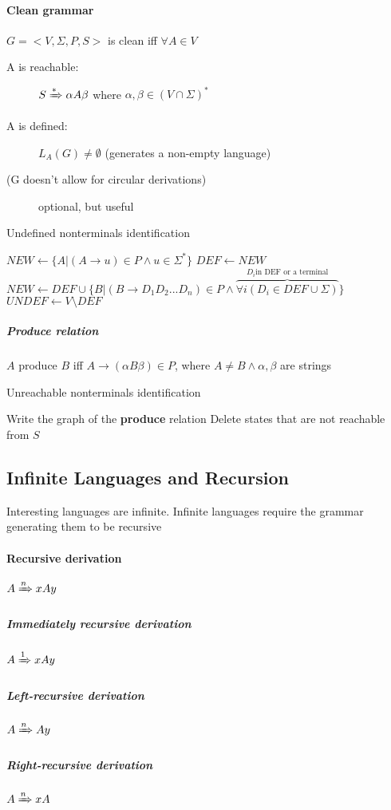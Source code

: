 \documentclass{article}
\newcommand{\derives}[1][ ]{\xRightarrow{#1}}
\begin{document}
\paragraph{Clean grammar} $G=<V,\Sigma, P, S>$ is clean iff $\forall A \in V$
\begin{description}
\item[A is reachable:] $S \derives[*] \alpha A \beta$ where $\alpha , \beta \in (V \cap \Sigma)^*$
\item[A is defined:] $L_A(G)\neq \emptyset$ (generates a non-empty language)
\item[(G doesn't allow for circular derivations)] optional, but useful
\end{description}
\begin{algorithm}[h!]
\caption{Undefined nonterminals identification}
\begin{algorithmic}
\STATE $NEW \leftarrow \{A|(A\rightarrow u) \in P \wedge u \in \Sigma^*\}$
\REPEAT
\STATE $DEF \leftarrow NEW$
\STATE $NEW \leftarrow DEF \cup \{B | (B \rightarrow D_1D_2...D_n)\in P \wedge \overbrace{\forall i(D_i\in DEF \cup \Sigma)}^{D_i \text{in DEF or a terminal}}\}$
\STATE $UNDEF \leftarrow V \setminus DEF$
\end{algorithmic}
\end{algorithm}
\subparagraph{Produce relation} $A$ produce $B$ iff $A \rightarrow (\alpha B \beta)\in P$, where $A \neq B \wedge \alpha, \beta$ are strings
\begin{algorithm}[h!]
\caption{Unreachable nonterminals identification}
\begin{algorithmic}
\STATE Write the graph of the \textbf{produce} relation
\STATE Delete states that are not reachable from $S$
\end{algorithmic}
\end{algorithm}

\subsection{Infinite Languages and Recursion} 
Interesting languages are infinite. Infinite languages require the grammar generating them to be recursive
\paragraph{Recursive derivation} $A \derives[n] xAy$ 
\subparagraph{Immediately recursive derivation} $A \derives[1] xAy$ 
\subparagraph{Left-recursive derivation} $A \derives[n] Ay$ 
\subparagraph{Right-recursive derivation} $A \derives[n] xA$ 
\end{document}
